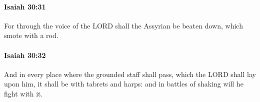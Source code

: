 		\paragraph{Isaiah 30:31} %
			\label{ISAIAH-30-31}

			For through the voice of the LORD shall the Assyrian be beaten down, which smote with a rod.


		\paragraph{Isaiah 30:32} %
			\label{ISAIAH-30-32}

			And in every place where the grounded staff shall pass, which the LORD shall lay upon him, it shall be with tabrets and harps: and in battles of shaking will he fight with it.


